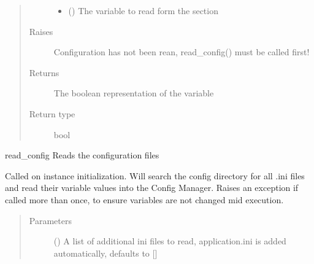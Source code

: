 \documentclass[letterpaper,10pt,english]{sphinxmanual}
\begin{document}
\begin{fulllineitems}
\begin{fulllineitems}
\begin{quote}
\begin{description}
\begin{itemize}
\item {} 
 () \textendash{} The variable to read form the section

\end{itemize}

\item[{Raises}] \leavevmode
{} \textendash{} Configuration has not been rean, read\_config() must be called first!

\item[{Returns}] \leavevmode
The boolean representation of the variable

\item[{Return type}] \leavevmode
bool

\end{description}\end{quote}

\end{fulllineitems}


\begin{fulllineitems}
\label{\detokenize{index:config.config_manager.Config.read_config}}
read\_config Reads the configuration files

Called on instance initialization. Will search the config
directory for all .ini files and read their variable values
into the Config Manager. Raises an exception if called more
than once, to ensure variables are not changed mid execution.
\begin{quote}\begin{description}
\item[{Parameters}] \leavevmode
{} (\sphinxstyleliteralemphasis{\sphinxupquote{, }}) \textendash{} A list of additional ini files to read, application.ini is added automatically, defaults to {[}{]}


\end{description}
\end{quote}
\end{fulllineitems}
\end{fulllineitems}
\end{document}
